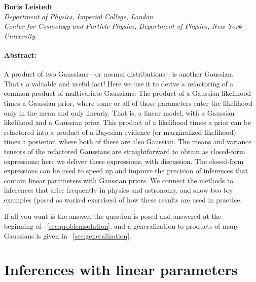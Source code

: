 \medskip\noindent\textbf{Boris Leistedt}\\
{\footnotesize%
  \textsl{Department of Physics, Imperial College, London}\\
  \textsl{Center for Cosmology and Particle Physics, Department of Physics, New York University}%
}

\paragraph{Abstract:}
A product of two Gaussians---or normal distributions---is another Gaussian.
That's a valuable and useful fact!
Here we use it to derive a refactoring of a common product of
multivariate Gaussians:
The product of a Gaussian likelihood times a Gaussian prior, where some or all
of those parameters enter the likelihood only in the mean and only linearly.
That is, a linear model, with a Gaussian likelihood and a Gaussian prior.
This product of a likelihood times a prior can be refactored into a product of a
Bayesian evidence (or marginalized likelihood) times a posterior, where both of
these are also Gaussian.
The means and variance tensors of the refactored Gaussians are straightforward
to obtain as closed-form expressions;
here we deliver these expressions, with discussion.
The closed-form expressions can be used to speed up and improve the precision
of inferences that contain linear parameters with Gaussian priors.
We connect the methods to inferences that arise frequently in physics
and astronomy, and show two toy examples (posed as worked exercises) of how
these results are used in practice.

If all you want is the answer, the question is posed and answered at the
beginning of \sectionname~\ref{sec:problemsolution}, and a generalization to
products of many Gaussians is given in \sectionname~\ref{sec:generalization}.

\section{Inferences with linear parameters}

